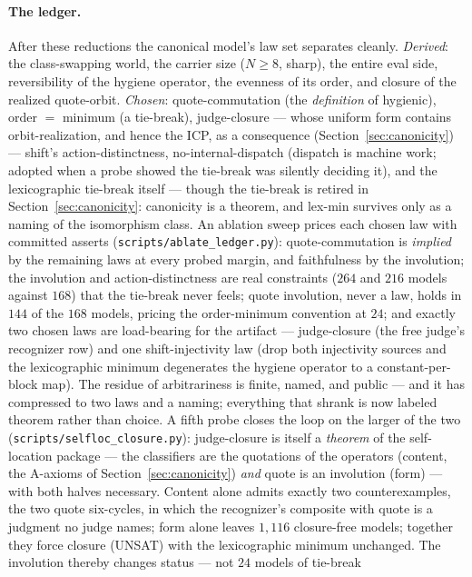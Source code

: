 \documentclass[sigconf,screen]{acmart}
\theoremstyle{remark}
\begin{document}
\paragraph{The ledger.}
After these reductions the canonical model's law set separates cleanly.
\emph{Derived}: the class-swapping world, the carrier size ($N \geq 8$,
sharp), the entire eval side, reversibility of the hygiene operator,
the evenness of its order, and closure of the realized quote-orbit.
\emph{Chosen}: quote-commutation (the \emph{definition} of hygienic),
order $=$ minimum (a tie-break), judge-closure --- whose uniform form
contains orbit-realization, and hence the ICP, as a consequence
(Section~\ref{sec:canonicity}) --- shift's action-distinctness,
no-internal-dispatch (dispatch is machine work; adopted when a probe
showed the tie-break was silently deciding it), and the lexicographic
tie-break itself --- though the tie-break is retired in
Section~\ref{sec:canonicity}: canonicity is a theorem, and lex-min
survives only as a naming of the isomorphism class. An ablation sweep
prices each chosen law with committed asserts
(\texttt{scripts/ablate\_ledger.py}): quote-commutation is
\emph{implied} by the remaining laws at every probed margin, and
faithfulness by the involution; the involution and
action-distinctness are real constraints ($264$ and $216$ models
against $168$) that the tie-break never feels; quote involution,
never a law, holds in $144$ of the $168$ models, pricing the
order-minimum convention at $24$; and exactly two chosen laws are
load-bearing for the artifact --- judge-closure (the free judge's
recognizer row) and one shift-injectivity law (drop both injectivity
sources and the lexicographic minimum degenerates the hygiene
operator to a constant-per-block map). The residue of arbitrariness
is finite, named, and public --- and it has compressed to two laws
and a naming; everything that shrank is now labeled theorem rather
than choice. A fifth probe closes the loop on the larger of the two
(\texttt{scripts/selfloc\_closure.py}): judge-closure is itself a
\emph{theorem} of the self-location package --- the classifiers are
the quotations of the operators (content, the A-axioms of
Section~\ref{sec:canonicity}) \emph{and} quote is an involution
(form) --- with both halves necessary. Content alone admits exactly
two counterexamples, the two quote six-cycles, in which the
recognizer's composite with quote is a judgment no judge names; form
alone leaves $1{,}116$ closure-free models; together they force
closure (UNSAT) with the lexicographic minimum unchanged. The
involution thereby changes status --- not $24$ models of tie-break
\end{document}

